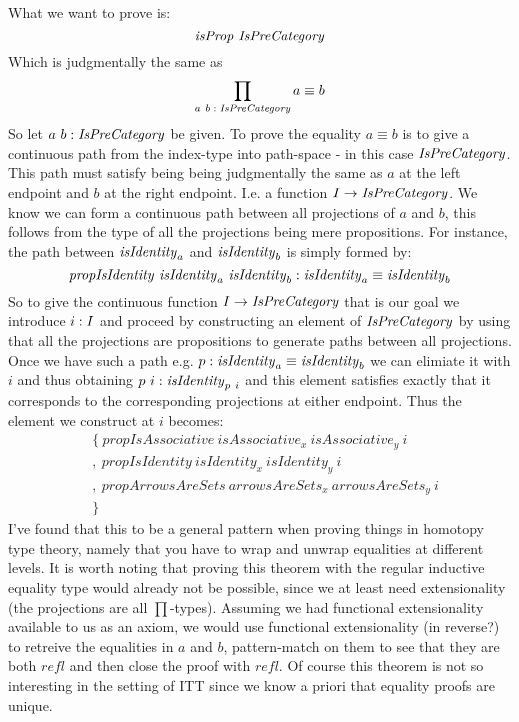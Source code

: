 What we want to prove is:
%
$$
\isProp\ \IsPreCategory
$$
%
Which is judgmentally the same as
%
$$
\prod_{a\ b \;\mathord{:}\; \mathit{IsPreCategory}} a \equiv b
$$
%
So let $a\ b \;\mathord{:}\; \mathit{IsPreCategory}$ be given. To prove the equality $a \equiv b$ is
to give a continuous path from the index-type into path-space - in this case
$\mathit{IsPreCategory}$. This path must satisfy being being judgmentally the same as
$a$ at the left endpoint and $b$ at the right endpoint. I.e. a function $I \to
\mathit{IsPreCategory}$. We know we can form a continuous path between all projections
of $a$ and $b$, this follows from the type of all the projections being mere
propositions. For instance, the path between $\mathit{isIdentity}_a$ and $\mathit{isIdentity}_b$
is simply formed by:
%
$$
\mathit{propIsIdentity}\ \mathit{isIdentity}_a\ \mathit{isIdentity}_b \;\mathord{:}\; \mathit{isIdentity}_a \equiv \mathit{isIdentity}_b
$$
%
So to give the continuous function $I \to \mathit{IsPreCategory}$ that is our goal we
introduce $i \;\mathord{:}\; I$ and proceed by constructing an element of $\mathit{IsPreCategory}$
by using that all the projections are propositions to generate paths between all
projections. Once we have such a path e.g. $p : \mathit{isIdentity}_a \equiv
\mathit{isIdentity}_b$ we can elimiate it with $i$ and thus obtaining $p\ i \;\mathord{:}\;
\mathit{isIdentity}_{p\ i}$ and this element satisfies exactly that it corresponds to
the corresponding projections at either endpoint. Thus the element we construct
at $i$ becomes:
%
\begin{align*}
  & \{\ \mathit{propIsAssociative}\   \mathit{isAssociative}_x\
       \mathit{isAssociative}_y\ i  \\
  & ,\  \mathit{propIsIdentity}\      \mathit{isIdentity}_x\
       \mathit{isIdentity}_y\ i  \\
  & ,\  \mathit{propArrowsAreSets}\ \mathit{arrowsAreSets}_x\
       \mathit{arrowsAreSets}_y\ i  \\
  & \}
\end{align*}
%
I've found that this to be a general pattern when proving things in homotopy
type theory, namely that you have to wrap and unwrap equalities at different
levels. It is worth noting that proving this theorem with the regular inductive
equality type would already not be possible, since we at least need
extensionality (the projections are all $\prod$-types). Assuming we had
functional extensionality available to us as an axiom, we would use functional
extensionality (in reverse?) to retreive the equalities in $a$ and $b$,
pattern-match on them to see that they are both $\mathit{refl}$ and then close
the proof with $\mathit{refl}$. Of course this theorem is not so interesting in
the setting of ITT since we know a priori that equality proofs are unique.

